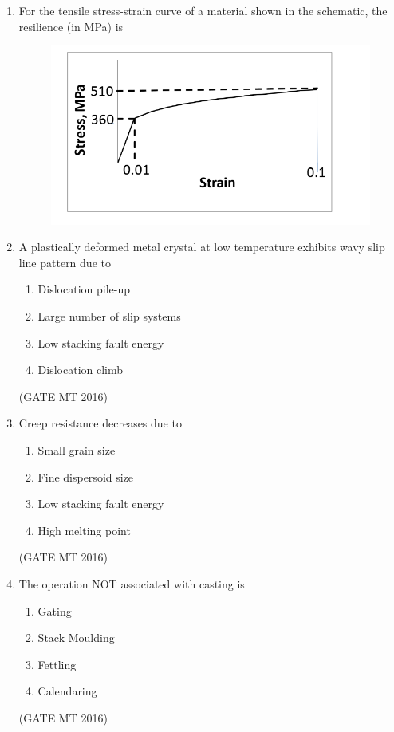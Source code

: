 \documentclass[11pt, letterpaper]{article}
\theoremstyle{remark}
\begin{document}
\begin{enumerate}
\item For the tensile stress-strain curve of a material shown in the schematic, the resilience (in MPa) is

\begin{figure}[H]
    \centering
    \includegraphics[width=0.5\linewidth]{figs/image3'.png}
    \caption{}
    \label{fig:placeholder}
\end{figure}

\item A plastically deformed metal crystal at low temperature exhibits wavy slip line pattern due
to
\begin{multicols}{2}
\begin{enumerate}
\item Dislocation pile-up
\item Large number of slip systems
\item Low stacking fault energy
\item Dislocation climb
\end{enumerate}
\end{multicols}
\hfill(GATE MT 2016)

\item Creep resistance decreases due to
\begin{multicols}{2}
\begin{enumerate}
\item Small grain size
\item Fine dispersoid size
\item Low stacking fault energy
\item High melting point
\end{enumerate}
\end{multicols}
\hfill(GATE MT 2016)

\item The operation NOT associated with casting is
\begin{multicols}{2}
\begin{enumerate}
\item Gating
\item Stack Moulding
\item Fettling
\item Calendaring
\end{enumerate}
\end{multicols}
\hfill(GATE MT 2016)


\end{enumerate}
\end{document}
